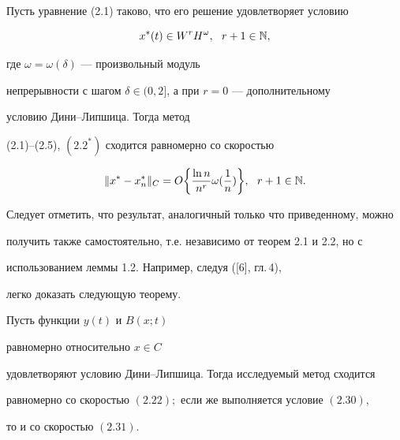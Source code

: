 \begin{cornonum}


Пусть уравнение (2.1) таково, что его решение удовлетворяет условию


\begin{equation}


x^*(t)\in W^rH^\omega,\ \ r+1\in \Bbb N,


\end{equation}


где $\omega=\omega(\delta)$ --- произвольный модуль


непрерывности с шагом $\delta\in (0,2]$, а при $r=0$ --- дополнительному


условию Дини--Липшица. Тогда метод


(2.1)--(2.5), $(2.2^*)$ сходится равномерно со скоростью


\begin{equation}


\|x^*-x^*_n\|_C=O\bigg\{\frac{\ln n}{n^r}\omega(\frac{1}{n})\bigg\},\ \


r+1\in \Bbb N.


\end{equation}


\end{cornonum}





Следует отметить, что результат, аналогичный только что приведенному, можно


получить также самостоятельно, т.е. независимо от теорем 2.1 и 2.2, но с


использованием леммы 1.2. Например, следуя ([6], гл.\,4),


легко доказать следующую теорему.





\begin{thms}


Пусть функции $y(t)$ и $B(x;t)$


равномерно относительно $x\in C$


удовлетворяют условию Дини--Липшица. Тогда исследуемый метод сходится


равномерно со скоростью $(2.22);$ если же выполняется условие $(2.30)$,


то и со скоростью $(2.31)$.


\end{thms}






